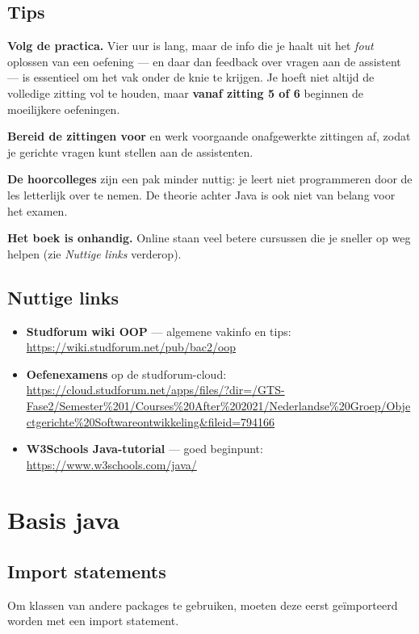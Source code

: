 \documentclass[a4paper,11pt]{article}
\begin{document}
\subsection{Tips}

\textbf{Volg de practica.} Vier uur is lang, maar de info die je haalt uit het
\textit{fout} oplossen van een oefening --- en daar dan feedback over vragen aan de
assistent --- is essentieel om het vak onder de knie te krijgen. Je hoeft niet
altijd de volledige zitting vol te houden, maar \textbf{vanaf zitting 5 of 6}
beginnen de moeilijkere oefeningen.

\textbf{Bereid de zittingen voor} en werk voorgaande onafgewerkte zittingen af,
zodat je gerichte vragen kunt stellen aan de assistenten.

\textbf{De hoorcolleges} zijn een pak minder nuttig: je leert niet programmeren
door de les letterlijk over te nemen. De theorie achter Java is ook niet van
belang voor het examen.

\textbf{Het boek is onhandig.} Online staan veel betere cursussen die je sneller
op weg helpen (zie \textit{Nuttige links} verderop).



\subsection{Nuttige links}
\label{sec:oop-links}

\begingroup\sloppy
\begin{itemize}
    \item \textbf{Studforum wiki OOP} --- algemene vakinfo en tips: \\
          \url{https://wiki.studforum.net/pub/bac2/oop}
    \item \textbf{Oefenexamens} op de studforum-cloud: \\
          \url{https://cloud.studforum.net/apps/files/?dir=/GTS-Fase2/Semester\%201/Courses\%20After\%202021/Nederlandse\%20Groep/Objectgerichte\%20Softwareontwikkeling&fileid=794166}
    \item \textbf{W3Schools Java-tutorial} --- goed beginpunt: \\
          \url{https://www.w3schools.com/java/}
\end{itemize}
\endgroup

\section{Basis java}
\subsection{Import statements}
Om klassen van andere packages te gebruiken,
moeten deze eerst geïmporteerd worden met een import statement.\\
\end{document}
